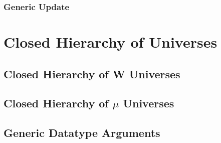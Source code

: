 \documentclass[12pt]{report}
\theoremstyle{definition}
\theoremstyle{remark}
\numberwithin{definition}{section}
\numberwithin{equation}{section}
\numberwithin{proposition}{section}
\numberwithin{conjecture}{section}
\numberwithin{theorem}{section}
\numberwithin{lemma}{section}
\numberwithin{corollary}{section}
\numberwithin{example}{section}
\numberwithin{remark}{section}
\begin{document}
\section{Generic Update}



\part{Closed Hierarchy of Universes}\label{part:hier}

\chapter{Closed Hierarchy of W Universes}\label{ch:hier}
\chapter{Closed Hierarchy of $\mu$ Universes}\label{ch:hier}
\chapter{Generic Datatype Arguments}\label{ch:gargs}




\end{document}
